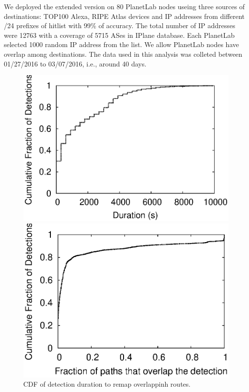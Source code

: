 We deployed the extended \dtrack{} version on 80 PlanetLab nodes useing three 
sources of destinations: TOP100 Alexa,  RIPE Atlas devices and IP addresses from 
different /24 prefixes of  hitlist with 99\% of accuracy. The total number of IP 
addresses were 12763 with a coverage of 5715 ASes in IPlane database. Each PlanetLab selected
1000 random IP address from the list. We allow PlanetLab nodes have overlap
among destinations. The data used in this analysis was colleted between 01/27/2016 
to 03/07/2016, i.e., around 40 days.

\begin{figure}
\vspace{5mm}
\begin{minipage}{0.32\textwidth}
\includegraphics[width=1.05\columnwidth]{figs/patching/durationdetection/durationdetection.eps}
\caption{CDF of detection duration to remap overlappinh routes. }
\label{fig:overlap.delay.cdf}
%
\end{minipage}
\hfill
\begin{minipage}{0.32\textwidth}
\includegraphics[width=1.05\columnwidth]{figs/patching/routesoverlapping/routesoverlapping.eps}

\end{minipage}
\end{figure}
